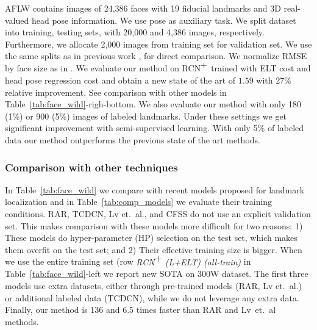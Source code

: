 \documentclass[10pt,twocolumn,letterpaper]{article}
\begin{document}
AFLW \cite{AFLW_2011} contains images of 24,386 faces with 19 fiducial landmarks and 3D real-valued head pose information. We use pose as auxiliary task.
We split dataset into training,  testing sets, with 20,000 and 4,386 images, respectively. Furthermore, we allocate 2,000 images from training set for validation set. We use the same splits as in previous work \cite{ren2014face}, \cite{Lv_2017_CVPR} for direct comparison. We normalize RMSE by face size as in \cite{Lv_2017_CVPR}. 
%
We evaluate our method on RCN$\stackanchor{+}{}$ trained with ELT cost and head pose regression cost and obtain a new state of the art of $1.59$ with 27\% relative improvement. See comparison with other models in Table~\ref{tab:face_wild}-righ-bottom. We also evaluate our method with only 180 (1\%) or 900 (5\%) images of labeled landmarks. Under these settings we get significant improvement  with semi-supervised learning. With only 5\% of labeled data our method outperforms the previous state of the art methods.\subsubsection{Comparison with other techniques}\label{sec:exp_comparison}\vskip-5pt
In Table~\ref{tab:face_wild} we compare with recent models proposed for landmark localization and in Table~\ref{tab:comp_models} we evaluate their training conditions. RAR, TCDCN, Lv et.~al., and CFSS do not use an explicit validation set. This makes comparison with these models more difficult for two reasons: 1) These models do hyper-parameter (HP) selection on the test set, which makes them overfit on the test set; and 2) Their effective training size is bigger. When we use the entire training set (row \emph{RCN$\stackanchor{+}{}$ (L+ELT) (all-train)} in Table~\ref{tab:face_wild}-left we report new SOTA on 300W dataset. The first three models use extra datasets, either through pre-trained models (RAR, Lv et.~al.) or additional labeled data (TCDCN), while we do not leverage any extra data. 
Finally, our method is 136 and 6.5 times faster than RAR and Lv~et.~al methods.
\vskip-30pt
\end{document}
